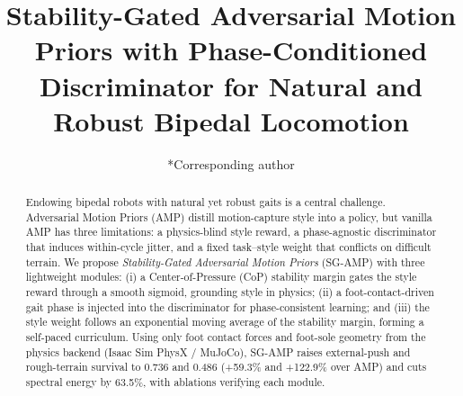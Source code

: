 \documentclass[conference]{IEEEtran}
\begin{document}
\title{Stability-Gated Adversarial Motion Priors with Phase-Conditioned Discriminator for Natural and Robust Bipedal Locomotion%
}

\author{
\and
{}
\and
{}
\and
{}
*Corresponding author}

\maketitle

\begin{abstract}
Endowing bipedal robots with natural yet robust gaits is a central challenge. Adversarial Motion Priors (AMP) distill motion-capture style into a policy, but vanilla AMP has three limitations: a physics-blind style reward, a phase-agnostic discriminator that induces within-cycle jitter, and a fixed task--style weight that conflicts on difficult terrain. We propose \emph{Stability-Gated Adversarial Motion Priors} (SG-AMP) with three lightweight modules: (i) a Center-of-Pressure (CoP) stability margin gates the style reward through a smooth sigmoid, grounding style in physics; (ii) a foot-contact-driven gait phase is injected into the discriminator for phase-consistent learning; and (iii) the style weight follows an exponential moving average of the stability margin, forming a self-paced curriculum. Using only foot contact forces and foot-sole geometry from the physics backend (Isaac Sim PhysX / MuJoCo), SG-AMP raises external-push and rough-terrain survival to 0.736 and 0.486 (+59.3\% and +122.9\% over AMP) and cuts spectral energy by 63.5\%, with ablations verifying each module.
\end{abstract}
\end{document}
